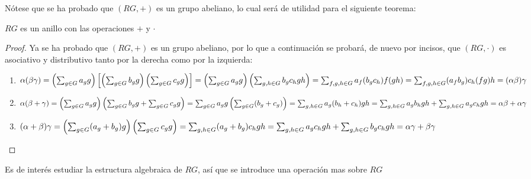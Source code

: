 Nótese que se ha probado que $(RG,+)$ es un grupo abeliano, lo cual será de utilidad para el siguiente teorema:
\begin{teorema}
$RG$ es un anillo con las operaciones $+$ y $\cdot$
\end{teorema}
\begin{proof}
Ya se ha probado que $(RG,+)$ es un grupo abeliano, por lo que a continuación se probará, de nuevo por incisos, que $(RG,\cdot)$ es asociativo y distributivo tanto por la derecha como por la izquierda:
\begin{enumerate}
\item $\alpha(\beta\gamma) = \left(\sum_{g \in G} a_{g} g\right)\left[\left(\sum_{g \in G} b_{g} g\right)\left(\sum_{g \in G} c_{g} g\right)\right] = \left(\sum_{g \in G} a_{g} g\right)\left(\sum_{g,h\in G}b_gc_hgh\right) = \sum_{f,g,h \in G}a_f(b_gc_h)f(gh) = \sum_{f,g,h \in G} (a_fb_g)c_h(fg)h = (\alpha\beta)\gamma$
\item  $\alpha(\beta + \gamma) = \left( \sum_{g \in G} a_{g} g \right) \left(\sum_{g \in G} b_{g} g + \sum_{g \in G} c_{g} g \right) = \sum_{g \in G} a_{g} g \left( \sum_{g \in G}(b_g+c_g)\right) = \sum_{g,h \in G}a_g(b_h+c_h)gh  = \sum_{g,h \in G} a_gb_hgh + \sum_{g,h \in G} a_gc_hgh = \alpha\beta + \alpha\gamma$  
\item $(\alpha + \beta)\gamma = \left( \sum_{g\in G}(a_g+b_g)g\right) \left(\sum_{g \in G} c_{g} g\right) = \sum_{g,h \in G} (a_g+b_g)c_hgh = \sum_{g,h \in G}a_gc_hgh + \sum_{g,h\in G}b_gc_hgh = \alpha\gamma + \beta\gamma$ \qedhere


\end{enumerate}
\end{proof}


Es de interés estudiar la estructura algebraica de $RG$, así que se introduce una operación mas sobre $RG$


